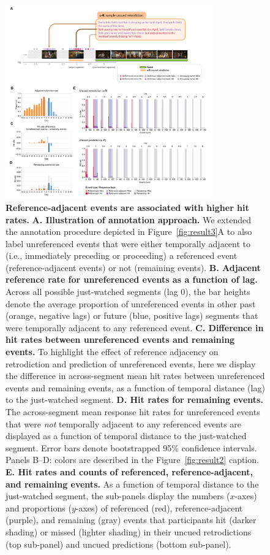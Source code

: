 \documentclass[10pt]{article}
\begin{document}
\begin{figure}[tp]
  \centering
  \includegraphics[width=0.8\textwidth]{results4}
  \caption{\textbf{Reference-adjacent events are associated with higher hit rates.}  \textbf{A. Illustration of annotation approach.}  We extended the annotation procedure depicted in Figure~\ref{fig:result3}A to also label unreferenced events that were either temporally adjacent to (i.e., immediately preceding or proceeding) a referenced event (reference-adjacent events) or not (remaining events).  \textbf{B. Adjacent reference rate for unreferenced events as a function of lag.}  Across all possible just-watched segments (lag 0), the bar heights denote the average proportion of unreferenced events in other past (orange, negative lags) or future (blue, positive lags) segments that were temporally adjacent to any referenced event.  \textbf{C. Difference in hit rates between unreferenced events and remaining events.}  To highlight the effect of reference adjacency on retrodiction and prediction of unreferenced events, here we display the difference in across-segment mean hit rates between unreferenced events and remaining events, as a function of temporal distance (lag) to the just-watched segment.  \textbf{D.  Hit rates for remaining events.}  The across-segment mean response hit rates for unreferenced events that were \textit{not} temporally adjacent to any referenced events are displayed as a function of temporal distance to the just-watched segment. Error bars denote bootstrapped 95\% confidence intervals.  Panels B--D: colors are described in the Figure~\ref{fig:result2} caption.  \textbf{E. Hit rates and counts of referenced, reference-adjacent, and remaining events.}  As a function of temporal distance to the just-watched segment, the sub-panels display the numbers ($x$-axes) and proportions ($y$-axes) of referenced (red), reference-adjacent (purple), and remaining (gray) events that participants hit (darker shading) or missed (lighter shading) in their uncued retrodictions (top sub-panel) and uncued predictions (bottom sub-panel).}
  \label{fig:result4}
\end{figure}
\end{document}
